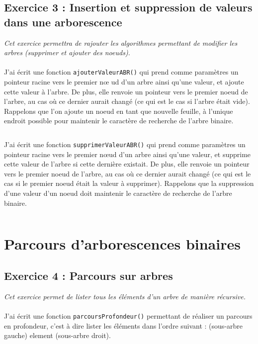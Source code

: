 \subsection{Exercice 3 : Insertion et suppression de valeurs dans une arborescence}
\textit{Cet exercice permettra de rajouter les algorithmes permettant de modifier les arbres (supprimer et ajouter des noeuds).}
\\\\
J'ai écrit une fonction \texttt{ajouterValeurABR()} qui prend comme paramètres un pointeur racine vers le premier nœ ud d’un arbre ainsi qu’une valeur, et ajoute cette valeur à l’arbre. De plus, elle renvoie un pointeur vers le premier noeud de l’arbre, au cas où ce dernier aurait changé (ce qui est le cas si l’arbre était vide). Rappelons que l’on ajoute un noeud en tant que nouvelle feuille, à l’unique endroit possible pour maintenir le caractère de recherche de l’arbre binaire.
\inputminted[linenos,firstline=8,lastline=19]{cpp}{../sources/cpp/TP3-4/modifArbres.c}

J'ai écrit une fonction \texttt{supprimerValeurABR()} qui prend comme paramètres un pointeur racine vers le premier nœud d’un arbre ainsi qu’une valeur, et supprime cette valeur de l’arbre si cette dernière existait. De plus, elle renvoie un pointeur vers le premier noeud de l’arbre, au cas où ce dernier aurait changé (ce qui est le cas si le premier noeud était la valeur à supprimer). Rappelons que la suppression d’une valeur d’un noeud doit maintenir le caractère de recherche de l’arbre binaire.
\inputminted[linenos,firstline=21,lastline=94]{cpp}{../sources/cpp/TP3-4/modifArbres.c}

\section{Parcours d’arborescences binaires}

\subsection{Exercice 4 : Parcours sur arbres}
\textit{Cet exercice permet de lister tous les éléments d'un arbre de manière récursive.}
\\\\
J'ai écrit une fonction \texttt{parcoursProfondeur()} permettant de réaliser un parcours en profondeur, c’est à dire lister les éléments dans l’ordre suivant : (sous-arbre gauche) element (sous-arbre droit).
\inputminted[linenos,firstline=8,lastline=18]{cpp}{../sources/cpp/TP3-4/parcoursArbres.c}
